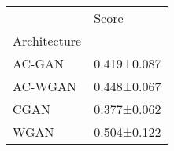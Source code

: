 \begin{tabular}{ll}
\toprule
{} &        Score \\
Architecture &              \\
\midrule
AC-GAN       &  0.419±0.087 \\
AC-WGAN      &  0.448±0.067 \\
CGAN         &  0.377±0.062 \\
WGAN         &  0.504±0.122 \\
\bottomrule
\end{tabular}
